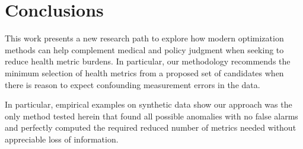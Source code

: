 \documentclass[conference]{IEEEtran}
\begin{document}



\section{Conclusions}

This work presents a new research path to explore how modern optimization methods can help complement medical and policy judgment when seeking to reduce health metric burdens.  In particular, our methodology recommends  the minimum selection of health metrics from a proposed set of candidates when there is reason to expect confounding measurement errors in the data.

In particular, empirical examples on synthetic data show our approach was the only method tested herein that found all possible anomalies with no false alarms and perfectly computed the required reduced number of metrics needed without appreciable loss of information. 

 


\end{document}
